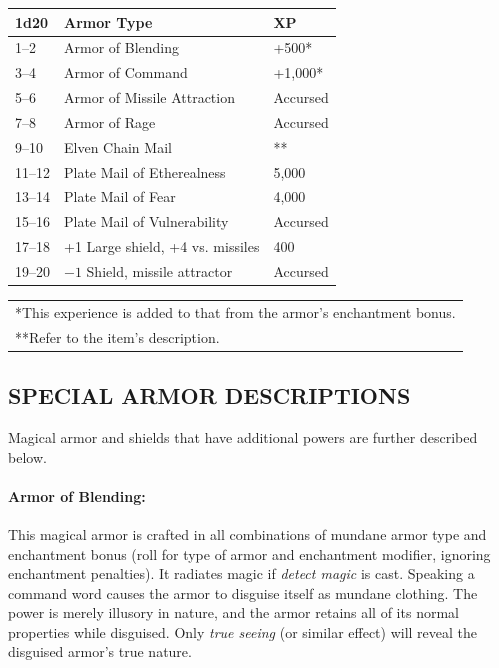 \begin{multicols}{2}
\begin{minipage}{\columnwidth}
\end{minipage}

\noindent \begin{minipage}{\columnwidth}

\label{specialarmors}

\noindent \begin{tabular}{|p{}|p{}|p{}|}
\hline
1d20	& Armor Type	& XP \\
\hline\hline
\rowcolor[gray]{.9}1--2	& Armor of Blending	& +500* \\
3--4	& Armor of Command	& +1,000* \\
\rowcolor[gray]{.9}5--6	& Armor of Missile Attraction	& Accursed \\
7--8	& Armor of Rage	& Accursed \\
\rowcolor[gray]{.9}9--10	& Elven Chain Mail	& ** \\
11--12	& Plate Mail of Etherealness	& 5,000 \\
\rowcolor[gray]{.9}13--14	& Plate Mail of Fear	& 4,000 \\
15--16	& Plate Mail of Vulnerability	& Accursed \\
\rowcolor[gray]{.9}17--18	& +1 Large shield, +4 vs. missiles	& 400 \\
19--20	& $-1$ Shield, missile attractor	& Accursed \\
\hline
\end{tabular}
\noindent\begin{tabular}{p{}}
*This experience is added to that from the armor's enchantment bonus. \\
**Refer to the item's description. \\
\end{tabular}\vspace{.5em}

\end{minipage}

\subsection{SPECIAL ARMOR DESCRIPTIONS}

Magical armor and shields that have additional powers are further described below.

\paragraph{Armor of Blending:} This magical armor is crafted in all combinations of mundane armor type and enchantment bonus (roll for type of armor and enchantment modifier, ignoring enchantment penalties).  It radiates magic if \textit{detect magic} is cast.  Speaking a command word causes the armor to disguise itself as mundane clothing.  The power is merely illusory in nature, and the armor retains all of its normal properties while disguised.  Only \textit{true seeing} (or similar effect) will reveal the disguised armor's true nature.


\end{multicols}
